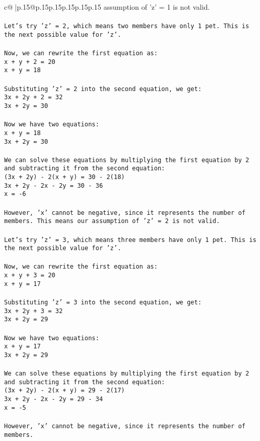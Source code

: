 \documentclass{article}
\begin{document}
{\begin{supertabular}{c@{$\;$}|p{.15\linewidth}@{}p{.15\linewidth}p{.15\linewidth}p{.15\linewidth}p{.15\linewidth}p{.15\linewidth}}
{{{assumption of 'z' = 1 is not valid.\\ \tt \\ \tt Let's try 'z' = 2, which means two members have only 1 pet. This is the next possible value for 'z'.\\ \tt \\ \tt Now, we can rewrite the first equation as:\\ \tt x + y + 2 = 20\\ \tt x + y = 18\\ \tt \\ \tt Substituting 'z' = 2 into the second equation, we get:\\ \tt 3x + 2y + 2 = 32\\ \tt 3x + 2y = 30\\ \tt \\ \tt Now we have two equations:\\ \tt x + y = 18\\ \tt 3x + 2y = 30\\ \tt \\ \tt We can solve these equations by multiplying the first equation by 2 and subtracting it from the second equation:\\ \tt (3x + 2y) - 2(x + y) = 30 - 2(18)\\ \tt 3x + 2y - 2x - 2y = 30 - 36\\ \tt x = -6\\ \tt \\ \tt However, 'x' cannot be negative, since it represents the number of members. This means our assumption of 'z' = 2 is not valid.\\ \tt \\ \tt Let's try 'z' = 3, which means three members have only 1 pet. This is the next possible value for 'z'.\\ \tt \\ \tt Now, we can rewrite the first equation as:\\ \tt x + y + 3 = 20\\ \tt x + y = 17\\ \tt \\ \tt Substituting 'z' = 3 into the second equation, we get:\\ \tt 3x + 2y + 3 = 32\\ \tt 3x + 2y = 29\\ \tt \\ \tt Now we have two equations:\\ \tt x + y = 17\\ \tt 3x + 2y = 29\\ \tt \\ \tt We can solve these equations by multiplying the first equation by 2 and subtracting it from the second equation:\\ \tt (3x + 2y) - 2(x + y) = 29 - 2(17)\\ \tt 3x + 2y - 2x - 2y = 29 - 34\\ \tt x = -5\\ \tt \\ \tt However, 'x' cannot be negative, since it represents the number of members. }}}
\end{supertabular}}
\end{document}
